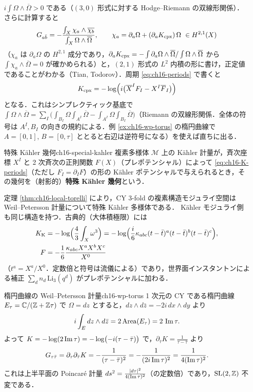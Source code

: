 $i\int\Omega\wedge\overline\Omega>0$ である（$(3,0)$ 形式に対する Hodge--Riemann の双線形関係）．さらに計算すると
\[
G_{a\bar b}=-\frac{\int_X\chi_a\wedge\overline{\chi_{b}}}{\int_X\Omega\wedge\overline\Omega},\qquad \chi_a=\partial_a\Omega+(\partial_aK_{\rm cpx})\,\Omega\ \in H^{2,1}(X)
\]
（$\chi_a$ は $\partial_a\Omega$ の $H^{2,1}$ 成分であり，$\partial_aK_{\rm cpx}=-\int\partial_a\Omega\wedge\overline\Omega/\int\Omega\wedge\overline\Omega$ から $\int\chi_a\wedge\overline\Omega=0$ が確かめられる）と，$(2,1)$ 形式の $L^2$ 内積の形に書け，正定値であることがわかる（Tian, Todorov）．周期 \eqref{eq:ch16-periods} で書くと
\begin{equation}
K_{\rm cpx}=-\log\Bigl(i\bigl(\overline{X}^IF_I-X^I\overline{F}_I\bigr)\Bigr)
\label{eq:ch16-K-periods}
\end{equation}
となる．これはシンプレクティック基底で $\int\Omega\wedge\overline\Omega=\sum_I\bigl(\int_{B_I}\Omega\int_{A^I}\overline\Omega-\int_{A^I}\Omega\int_{B_I}\overline\Omega\bigr)$（Riemann の双線形関係．全体の符号は $A^I,B_I$ の向きの規約による．例 \ref{ex:ch16-wp-torus} の楕円曲線で $A=[0,1]$, $B=[0,\tau]$ ととると右辺は逆符号になる）を使えば直ちに出る．

\begin{mydef}{特殊 K\"ahler 幾何}{ch16-special-kahler}
複素多様体 $\mathcal{M}$ 上の K\"ahler 計量が，斉次座標 $X^I$ と 2 次斉次の正則関数 $F(X)$（プレポテンシャル）によって \eqref{eq:ch16-K-periods}（ただし $F_I=\partial_IF$）の形の K\"ahler ポテンシャルで与えられるとき，その幾何を（射影的）\textbf{特殊 K\"ahler 幾何}という．
\end{mydef}

定理 \ref{thm:ch16-local-torelli} により，CY 3-fold の複素構造モジュライ空間は Weil--Petersson 計量について特殊 K\"ahler 多様体である．
K\"ahler モジュライ側も同じ構造を持つ．古典的（大体積極限）には
\begin{equation}
\begin{aligned}
K_{\rm K}&=-\log\Bigl(\frac43\int_X\omega^3\Bigr)=-\log\Bigl(\frac{i}{6}\kappa_{abc}(t-\bar t)^a(t-\bar t)^b(t-\bar t)^c\Bigr),\\
F&=-\frac{1}{6}\frac{\kappa_{abc}X^aX^bX^c}{X^0}
\end{aligned}
\label{eq:ch16-K-kahler}
\end{equation}
（$t^a=X^a/X^0$．定数倍と符号は流儀による）であり，世界面インスタントンによる補正 $\sum_d n_d\,\mathrm{Li}_3(q^d)$ がプレポテンシャルに加わる．

\begin{myex}{楕円曲線の Weil--Petersson 計量}{ch16-wp-torus}
1 次元の CY である楕円曲線 $E_\tau=\mathbb{C}/(\mathbb{Z}+\mathbb{Z}\tau)$ で $\Omega=dz$ とすると，$dz\wedge d\bar z=-2i\,dx\wedge dy$ より
\[
i\int_E dz\wedge d\bar z=2\,\mathrm{Area}(E_\tau)=2\,\operatorname{Im}\tau .
\]
よって $K=-\log(2\operatorname{Im}\tau)=-\log\bigl(-i(\tau-\bar\tau)\bigr)$ で，$\partial_{\bar\tau}K=\frac{1}{\tau-\bar\tau}$ より
\[
G_{\tau\bar\tau}=\partial_\tau\partial_{\bar\tau}K=-\frac{1}{(\tau-\bar\tau)^2}=-\frac{1}{(2i\operatorname{Im}\tau)^2}=\frac{1}{4(\operatorname{Im}\tau)^2}.
\]
これは上半平面の Poincar\'e 計量 $ds^2=\frac{|d\tau|^2}{4(\operatorname{Im}\tau)^2}$（の定数倍）であり，$\operatorname{SL}(2,\mathbb{Z})$ 不変である．
\end{myex}

